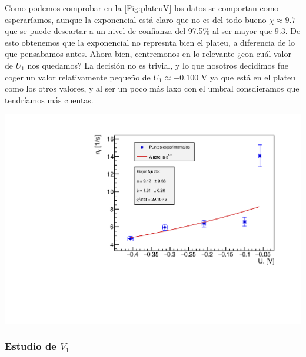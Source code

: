 \documentclass[11pt]{article}
\begin{document}
\begin{minipage}[t]{0.4\linewidth}
	\begingroup
	\setlength{\parskip}{2.2mm} %
	Como podemos comprobar en la \cref{Fig:plateuV} los datos se comportan como esperaríamos, aunque la exponencial está claro que no es del todo bueno $\chi\approx 9.7$ que se puede descartar a un nivel de confianza del 97.5\% al ser mayor que $9.3$. De esto obtenemos que la exponencial no represnta bien el plateu, a diferencia de lo que pensabamos antes. Ahora bien, centremonos en lo relevante ¿con cuál valor de $U_1$ nos quedamos? La decisión no es trivial, y lo que nosotros decidimos fue coger un valor relativamente pequeño de $U_1\approx - 0.100$ V ya que  está en el plateu como los otros valores, y al ser un poco más laxo con el umbral consdieramos que tendríamos más cuentas. 
	\endgroup
\end{minipage}
\hfill
\begin{minipage}[t]{0.63\linewidth}
	\begin{center}
		\label{Fig:plateuU}
		\vspace{-1.0em}
		\includegraphics[width=0.95\linewidth]{../Graficas/GraficoU.pdf}
	\end{center}
\end{minipage}




\subsubsection{Estudio de $V_1$}
\end{document}
